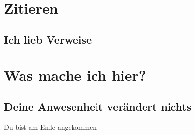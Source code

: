 \documentclass[]{scrartcl}
\begin{document}
\section{Zitieren}
\subsection{Ich lieb Verweise}
\cite{9781848549562}

\appendix
\section{Was mache ich hier?}
\subsection{Deine Anwesenheit verändert nichts}
Du bist am Ende angekommen



\end{document}
